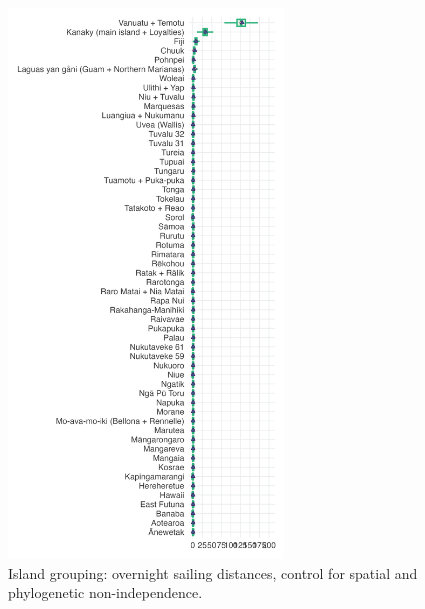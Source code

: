 \documentclass[unnumsec,webpdf,modern,medium]{oup-authoring-template}
\begin{document}
\begin{figure}[ht]
\includegraphics[width=0.65\textwidth]{brms_predict_SBZR_control_spatialphylo.png}
\caption{Island grouping: overnight sailing distances, control for spatial and phylogenetic non-independence.}
\label{brms_predict_SBZR_control_spatialphylo}
\end{figure}
\end{document}
